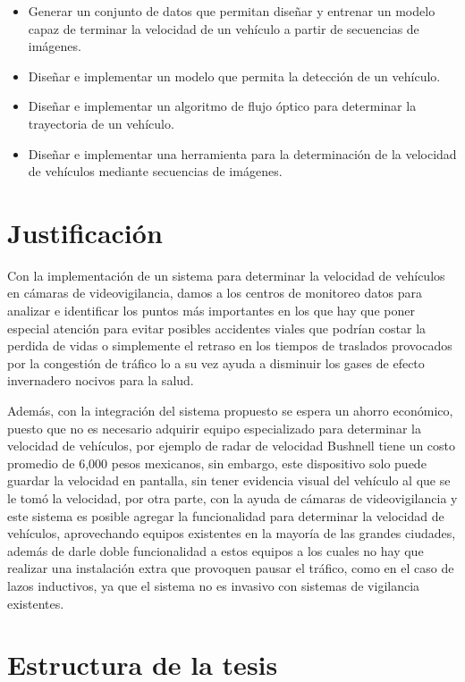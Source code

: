 \begin{itemize}
    \item Generar un conjunto de datos que permitan diseñar y entrenar un modelo capaz de terminar la velocidad de un vehículo a partir de secuencias de imágenes.
    \item Diseñar e implementar un modelo que permita la detección de un vehículo. 
    \item Diseñar e implementar un algoritmo de flujo óptico para determinar la trayectoria de un vehículo.
    \item Diseñar e implementar una herramienta para la determinación de la velocidad de vehículos mediante secuencias de imágenes.
\end{itemize}

\section{Justificación}

Con la implementación de un sistema para determinar la velocidad de vehículos en cámaras de videovigilancia, damos a los centros de monitoreo datos para analizar e identificar los puntos más importantes en los que hay que poner especial atención para evitar posibles accidentes viales que podrían costar la perdida de vidas o simplemente el retraso en los tiempos de traslados provocados por la congestión  de tráfico lo a su vez ayuda a disminuir los gases de efecto invernadero nocivos para la salud.

Además, con la integración del sistema propuesto se espera un ahorro económico, puesto que no es necesario adquirir equipo especializado para determinar la velocidad de vehículos, por ejemplo de radar de velocidad Bushnell tiene un costo promedio de 6,000 pesos mexicanos, sin embargo, este dispositivo solo puede guardar la velocidad en pantalla, sin tener evidencia visual del vehículo al que se le tomó la velocidad, por otra parte, con la ayuda de cámaras de videovigilancia y este sistema es posible agregar la funcionalidad para determinar la velocidad de vehículos, aprovechando equipos existentes en la mayoría de las grandes ciudades, además de darle doble funcionalidad a estos equipos a los cuales no hay que realizar una instalación extra que provoquen pausar el tráfico, como en el caso de lazos inductivos, ya que el sistema no es invasivo con sistemas de vigilancia existentes.


\section{Estructura de la tesis}

